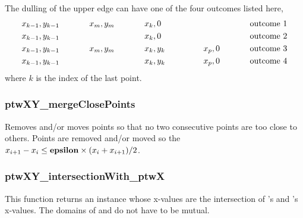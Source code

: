 The dulling of the upper edge can have one of the four outcomes listed here,
\begin{eqnarray}
    x_{k-1}, y_{k-1} \hskip .5 in x_m, y_m \hskip .5 in            & x_k, 0 & \hskip .5 in  \hphantom{x_p, 0} \hskip .5 in {\rm outcome \ 1} \nonumber \\
    x_{k-1}, y_{k-1} \hskip .5 in \hphantom{x_m, y_m} \hskip .5 in & x_k, 0 & \hskip .5 in  \hphantom{x_p, 0} \hskip .5 in {\rm outcome \ 2} \nonumber \\
    x_{k-1}, y_{k-1} \hskip .5 in x_m, y_m \hskip .5 in            & x_k, y_k & \hskip .5 in x_p, 0 \hskip .5 in {\rm outcome \ 3} \nonumber \\
    x_{k-1}, y_{k-1} \hskip .5 in \hphantom{x_m, y_m} \hskip .5 in & x_k, y_k & \hskip .5 in x_p, 0 \hskip .5 in {\rm outcome \ 4} \nonumber
\end{eqnarray}
where $k$ is the index of the last point.

\subsubsection{ptwXY\_mergeClosePoints}
Removes and/or moves points so that no two consecutive points are too close to others.
Points are removed and/or moved so the $x_{i+1} - x_i \le {\bf epsilon} \times ( x_i + x_{i+1} ) / 2$.

\subsubsection{ptwXY\_intersectionWith\_ptwX}
This function returns an  instance whose x-values are the intersection of 's and
's x-values. The domains of  and  do not have to be mutual.

